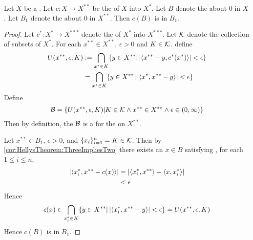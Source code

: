 \begin{thm}[Goldstine]
    \label{thm:GoldstinesTheorem}
    Let $X$ be a \SeminormedSpace.
    Let $c:X \to X^{**}$ be the \CanonicalEmbedding of $X$ into $X^*$.
    Let $B$ denote the \ClosedUnitBall about $0$ in $X$. 
    Let $B_1$ denote the \ClosedUnitBall about $0$ in $X^{**}$. 
    Then $c(B)$ is  \weakstar \TopologyDense in $B_1$. 
    \begin{proof}
    Let $c^*:X^* \to X^{***}$ denote the \CanonicalEmbedding 
    of $X^*$ into $X^{***}$. 
    Let $\mathcal{K}$ denote the collection of \Finite subsets of $X^*$. 
    For each $x^{**} \in X^{**}$, 
    $\epsilon > 0$
    and $K \in \mathcal{K}$. 
    define 
    \begin{align*}
    U(x^{**}, \epsilon,  K) 
    & := \bigcap\limits_{x^* \in K} \{y \in X^{**} | \left| \left\langle x^{**}-y, c^*(x^*) \right\rangle \right| < \epsilon \}  \\
    & = \bigcap\limits_{x^* \in K} \{y \in X^{**} | \left| \left\langle x^*, x^{**}-y \right\rangle \right| < \epsilon \}
    \end{align*}
    Define 
    \begin{align*}
        \mathcal{B} = \{U(x^{**}, \epsilon, K) | K \in \mathcal{K} \wedge x^{**} \in X^{**} \wedge \epsilon \in (0,\infty) \}
    \end{align*}
    Then by definition, the $\mathcal{B}$ is a
    \TopologyBasis for the \weakstar \Topology on $X^{**}$. 

    Let $x^{**} \in B_1$, $\epsilon > 0$, and $\{x_i\}_{i=1}^n = K \in \mathcal{K}$. 
    Then by 
    \ref{cor:HellysTheorem:ThreeImpliesTwo}
    there exists an $x \in B$ satisfying
    , for each $1 \leq i \leq n$, 
    \begin{align*}
    \left|  \left\langle x_i^*, x^{**} - c(x) \right\rangle \right| 
    & = \left| \left\langle x_i^*, x^{**} \right\rangle - \left\langle x, x_i^* \right\rangle \right| \\
    & < \epsilon
    \end{align*}
    Hence 
    \begin{equation*}
    c(x) \in \bigcap\limits_{x_i^* \in K} \{y \in X^{**} | \left| \left\langle x_i^*, x^{**} - y  \right\rangle \right|< \epsilon \} = U(x^{**}, \epsilon, K)
    \end{equation*}
    Hence $c(B)$ is \weakstar \TopologyDense in $B_1$. 
    \end{proof}
\end{thm} 
